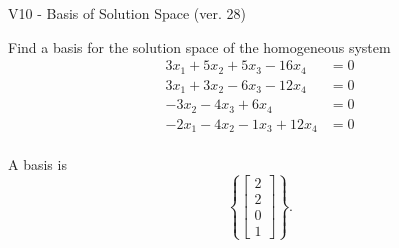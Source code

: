 \begin{exercise}
  \begin{exerciseTitle}V10 - Basis of Solution Space (ver. 28)\end{exerciseTitle}
  \begin{exerciseStatement}
    Find a basis for the solution space of the homogeneous system 
\begin{align*}
 3 x_ 1 + 5 x_ 2 + 5 x_ 3 -16 x_ 4 &= 0  \\ 
  3 x_ 1 + 3 x_ 2 -6 x_ 3 -12 x_ 4 &= 0  \\ 
  -3 x_ 2 -4 x_ 3 + 6 x_ 4 &= 0  \\ 
  -2 x_ 1 -4 x_ 2 -1 x_ 3 + 12 x_ 4 &= 0  \\ 
 \end{align*}


 
  \end{exerciseStatement}

  \begin{exerciseAnswer}
   A basis is   
\[\left\{\left[\begin{array}{c}
2 \\
2 \\
0 \\
1
\end{array}\right]\right\}.\]

  


  \end{exerciseAnswer}
\end{exercise}